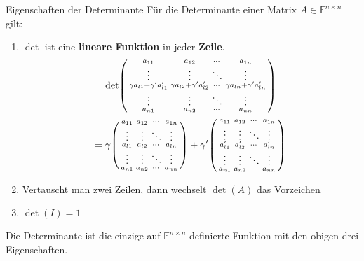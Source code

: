 \documentclass[a4paper,10pt]{article}
\def\E{\mathbb{E}}
\begin{document}
\begin{subbox}{Eigenschaften der Determinante}
  Für die Determinante einer Matrix $A \in \E^{n \times n}$ gilt:
  \begin{enumerate}
    \item{
      $\det$ ist eine \textbf{lineare Funktion} in jeder \textbf{Zeile}.\\
      $$\det \begin{psmallmatrix}
        a_{11} & a_{12} & \cdots & a_{1n} \\
        \vdots & \vdots & \ddots & \vdots \\
        \gamma a_{l1} + \gamma' a_{l1}' & \gamma a_{l2} + \gamma' a_{l2}' & \cdots & \gamma a_{ln} + \gamma' a_{ln}' \\
        \vdots & \vdots & \ddots & \vdots \\
        a_{n1} & a_{n2} & \cdots & a_{nn}
      \end{psmallmatrix}$$
      $$ = \gamma \begin{psmallmatrix}
        a_{11} & a_{12} & \cdots & a_{1n} \\
        \vdots & \vdots & \ddots & \vdots \\
        a_{l1} & a_{l2} & \cdots & a_{ln} \\
        \vdots & \vdots & \ddots & \vdots \\
        a_{n1} & a_{n2} & \cdots & a_{nn}
      \end{psmallmatrix} + \gamma' \begin{psmallmatrix}
        a_{11} & a_{12} & \cdots & a_{1n} \\
        \vdots & \vdots & \ddots & \vdots \\
        a_{l1}' & a_{l2}' & \cdots & a_{ln}' \\
        \vdots & \vdots & \ddots & \vdots \\
        a_{n1} & a_{n2} & \cdots & a_{nn}
      \end{psmallmatrix}$$
    }
    \item Vertauscht man zwei Zeilen, dann wechselt $\det(A)$ das Vorzeichen
    \item $\det(I) = 1$
  \end{enumerate}
  Die Determinante ist die einzige auf $\E^{n \times n}$ definierte Funktion mit den obigen drei Eigenschaften.
\end{subbox}
\end{document}
